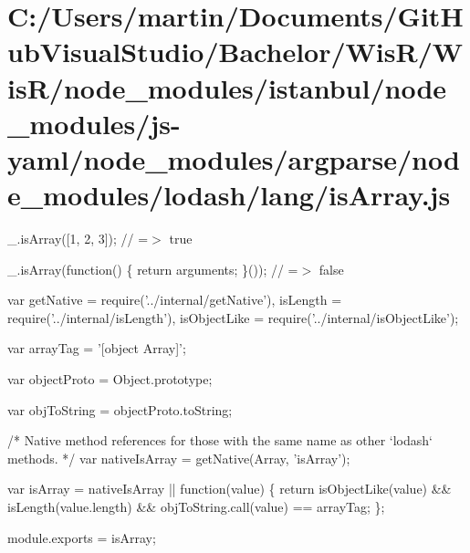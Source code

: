 \hypertarget{_c_1_2_users_2martin_2_documents_2_git_hub_visual_studio_2_bachelor_2_wis_r_2_wis_r_2node_modulec35415e899e4ca274fae1b3e5877672b}{}\section{C\+:/\+Users/martin/\+Documents/\+Git\+Hub\+Visual\+Studio/\+Bachelor/\+Wis\+R/\+Wis\+R/node\+\_\+modules/istanbul/node\+\_\+modules/js-\/yaml/node\+\_\+modules/argparse/node\+\_\+modules/lodash/lang/is\+Array.\+js}
\+\_\+.\+is\+Array(\mbox{[}1, 2, 3\mbox{]}); // =$>$ true

\+\_\+.\+is\+Array(function() \{ return arguments; \}()); // =$>$ false


\begin{DoxyCodeInclude}
var getNative = require(\textcolor{stringliteral}{'../internal/getNative'}),
    isLength = require(\textcolor{stringliteral}{'../internal/isLength'}),
    isObjectLike = require(\textcolor{stringliteral}{'../internal/isObjectLike'});

var arrayTag = \textcolor{stringliteral}{'[object Array]'};

var objectProto = Object.prototype;

var objToString = objectProto.toString;

\textcolor{comment}{/* Native method references for those with the same name as other `lodash` methods. */}
var nativeIsArray = getNative(Array, \textcolor{stringliteral}{'isArray'});

var isArray = nativeIsArray || \textcolor{keyword}{function}(value) \{
  \textcolor{keywordflow}{return} isObjectLike(value) && isLength(value.length) && objToString.call(value) == arrayTag;
\};

module.exports = isArray;
\end{DoxyCodeInclude}
 